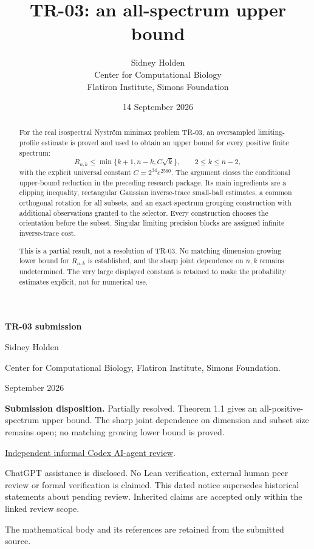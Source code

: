 \documentclass[11pt]{article}
\title{TR-03: an all-spectrum upper bound}
\author{Sidney Holden\\{\small Center for Computational Biology}\\{\small Flatiron Institute, Simons Foundation}}\date{14 September 2026}
\theoremstyle{remark}\newtheorem{remark}[theorem]{Remark}
\begin{document}
\begin{titlepage}
\thispagestyle{empty}
{\LARGE\bfseries TR-03 submission}\par\bigskip
{\Large Sidney Holden}\par\medskip
Center for Computational Biology, Flatiron Institute, Simons Foundation.\par{} September 2026\par\bigskip
\textbf{Submission disposition.} Partially resolved. Theorem 1.1 gives an all-positive-spectrum upper bound. The sharp joint dependence on dimension and subset size remains open; no matching growing lower bound is proved.\par\bigskip
\href{https://github.com/ajt60gaibb/OpenProblemsInNLA/blob/main/reviews/2026-09-14-further-submissions/TR-03-review.md}{Independent informal Codex AI-agent review}.\par\medskip
ChatGPT assistance is disclosed. No Lean verification, external human peer review or formal verification is claimed. This dated notice supersedes historical statements about pending review. Inherited claims are accepted only within the linked review scope.\par\bigskip
The mathematical body and its references are retained from the submitted source.\par
\end{titlepage}

\maketitle
\begin{abstract}
For the real isospectral Nystr\"om minimax problem TR-03, an oversampled limiting-profile estimate is proved and used to obtain an upper bound for every positive finite spectrum:
\[
 R_{n,k}\le \min\{k+1,n-k,C\sqrt{k}\},\qquad 2\le k\le n-2,
\]
with the explicit universal constant $C=2^{34}e^{2560}$. The argument closes the conditional upper-bound reduction in the preceding research package. Its main ingredients are a clipping inequality, rectangular Gaussian inverse-trace small-ball estimates, a common orthogonal rotation for all subsets, and an exact-spectrum grouping construction with additional observations granted to the selector. Every construction chooses the orientation before the subset. Singular limiting precision blocks are assigned infinite inverse-trace cost.

This is a partial result, not a resolution of TR-03. No matching dimension-growing lower bound for $R_{n,k}$ is established, and the sharp joint dependence on $n,k$ remains undetermined. The very large displayed constant is retained to make the probability estimates explicit, not for numerical use.
\end{abstract}
\tableofcontents
\newpage
\end{document}
